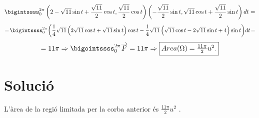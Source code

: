 \documentclass[12pt]{report}
\begin{document}
 \begin{gather*}
 \bigintssss_{0}^{2\pi}
     \left( 2-\sqrt{11}\sin{t}+\frac{\sqrt{11}}{2}\cos{t}, \frac{\sqrt{11}}{2}\cos{t} \right) \left( -\frac{\sqrt{11}}{2}\sin{t}, \sqrt{11}\cos{t}+\frac{\sqrt{11}}{2}\sin{t}\right) dt =
 \end{gather*}
\begin{gather*}
    = \! \bigintssss_0^{2\pi} \! \left(\frac{1}{4}\sqrt{11}\left(2\sqrt{11}\cos{t} + \sqrt{11}\sin{t}\right)\cos{t} - \frac{1}{4}\sqrt{11}\left(\sqrt{11}\cos{t} - 2\sqrt{11}\sin{t} + 4\right)\sin{t}\right) \! dt\! =
\end{gather*}
\begin{equation*}
    = 11\pi \Rightarrow \bigointssss_0^{2\pi} \overrightarrow{F} = 11\pi \Rightarrow \fcolorbox{black}{white}{$Area(\Omega)=\frac{11\pi}{2} u^2.$}
\end{equation*}




\section{Solució}
L'àrea de la regió limitada per la corba anterior és $\frac{11\pi}{2} u^2$ .



\end{document}
